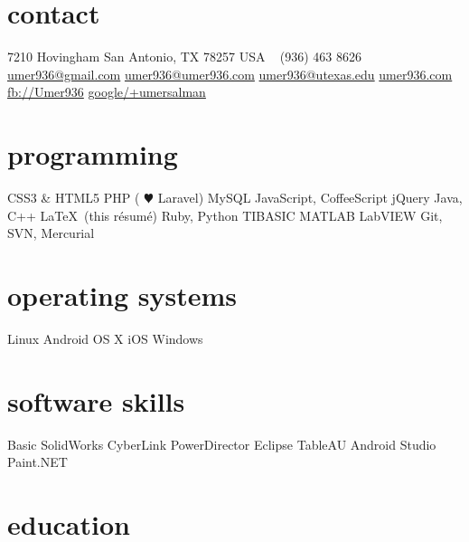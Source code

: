 \documentclass[]{friggeri-cv} %
\begin{document}


\begin{aside} %
	\section{contact}
	7210 Hovingham
	San Antonio, TX 78257
	USA
	~
	(936) 463 8626
	~
	\href{mailto:umer936@gmail.com}{umer936@gmail.com}
	\href{mailto:umer936@umer936.com}{umer936@umer936.com}
	\href{mailto:umer936@utexas.edu}{umer936@utexas.edu}
	\href{http://umer936.com}{umer936.com}
	\href{http://facebook.com/Umer936}{fb://Umer936}
	\href{http://google.com/+umersalman}{google/+umersalman}
	~
	\section{programming}
	CSS3 \& HTML5
	PHP ({\color{red} $\varheartsuit$} Laravel)
	MySQL
	JavaScript, CoffeeScript
	jQuery
	Java, C++
	\LaTeX \ (this r\'esum\'e)
	Ruby, Python
	TIBASIC
	MATLAB
	LabVIEW
	Git, SVN, Mercurial
	~
	\section{operating systems}
	Linux
	Android
	OS X
	iOS
	Windows
	~
	\section{software skills}
	Basic SolidWorks
	CyberLink PowerDirector
	Eclipse
	TableAU
	Android Studio
	Paint.NET
\end{aside}


\section{education}
\end{document}
